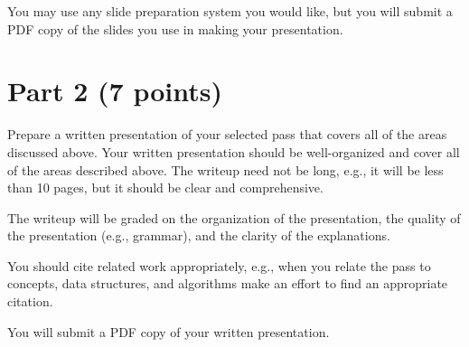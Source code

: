 \documentclass[12pt,letterpaper]{article}
\begin{document}
You may use any slide preparation system you would like, but you 
will submit a PDF copy of the slides you use in making your presentation.


\section*{Part 2 (7 points)}
Prepare a written presentation of your selected pass that covers all of
the areas discussed above.  Your written presentation should be well-organized 
and cover all of the areas described above.  The writeup need not be long,
e.g., it will be less than 10 pages, but it should be clear and comprehensive.

The writeup will be graded on the organization of the presentation,
the quality of the presentation (e.g., grammar), and
the clarity of the explanations.

You should cite related
work appropriately, e.g., when you relate the pass to concepts, data
structures, and algorithms make an effort to find an appropriate citation.

You will submit a PDF copy of your written presentation.
\end{document}
